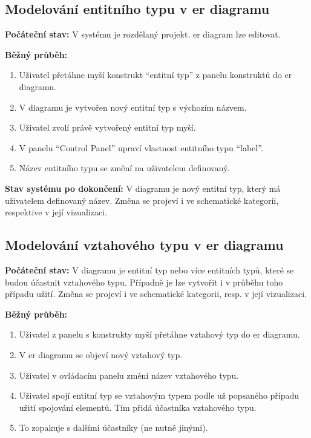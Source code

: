 \newcommand{\ucsub}[1]{\textbf{#1}}
\newcommand{\uc}[1]{\subsection*{#1}}
\def\ucstart{\ucsub{Počáteční stav: }}
\def\ucnormal{\ucsub{Běžný průběh:}}
\def\ucerrors{\ucsub{Možné chyby:}}
\def\ucend{\ucsub{Stav systému po dokončení: }}

\uc{Modelování entitního typu v \acrshort{er} diagramu}
\ucstart{}
V systému je rozdělaný projekt.
\acrshort{er} diagram lze editovat.

\ucnormal{}
\begin{enumerate}
  \item Uživatel přetáhne myší konstrukt \enquote{entitní typ} z panelu konstruktů do \acrshort{er} diagramu.
  \item V diagramu je vytvořen nový entitní typ s výchozím názvem.
  \item Uživatel zvolí právě vytvořený entitní typ myší.
  \item V panelu \enquote{Control Panel} upraví vlastnost entitního typu \enquote{label}.
  \item Název entitního typu se změní na uživatelem definovaný.
\end{enumerate}

\ucend{}
V diagramu je nový entitní typ, který má uživatelem definovaný název.
Změna se projeví i ve schematické kategorii, respektive v její vizualizaci.

\uc{Modelování vztahového typu v \acrshort{er} diagramu}
\ucstart{}
V diagramu je entitní typ nebo více entitních typů, které se budou účastnit vztahového typu.
Případně je lze vytvořit i v průběhu toho případu užití.
Změna se projeví i ve schematické kategorii, resp. v její vizualizaci.

\ucnormal{}
\begin{enumerate}
  \item Uživatel z panelu s konstrukty myší přetáhne vztahový typ do \acrshort{er} diagramu.
  \item V \acrshort{er} diagramu se objeví nový vztahový typ.
  \item Uživatel v ovládacím panelu změní název vztahového typu.
  \item Uživatel spojí entitní typ se vztahovým typem podle už popsaného případu užití spojování elementů. Tím přidá účastníka vztahového typu.
  \item To zopakuje s dalšími účastníky (ne nutně jinými).
\end{enumerate}

